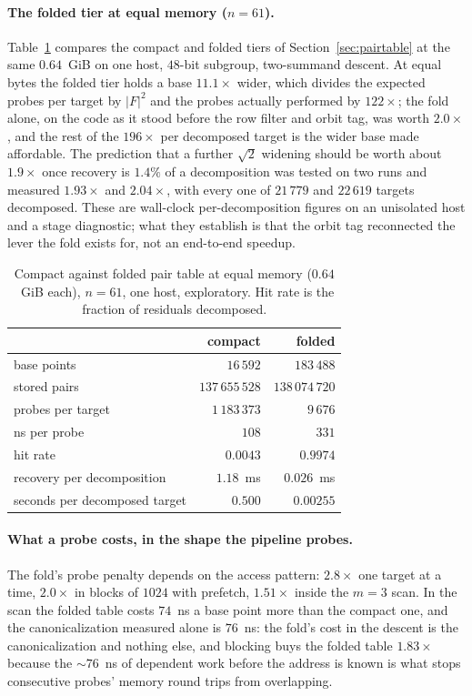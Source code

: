 \paragraph{The folded tier at equal memory ($n=61$).}
Table~\ref{tab:fold-equal} compares the compact and folded tiers of
Section~\ref{sec:pairtable} at the same $0.64$~GiB on one host, $48$-bit
subgroup, two-summand descent.
At equal bytes the folded tier holds a base $11.1\times$ wider, which
divides the expected probes per target by $|F|^2$ and the probes
actually performed by $122\times$; the fold alone, on the code as it
stood before the row filter and orbit tag, was worth $2.0\times$, and
the rest of the $196\times$ per decomposed target is the wider base
made affordable. The prediction that a further $\sqrt2$ widening
should be worth about $1.9\times$ once recovery is $1.4\%$ of a
decomposition was tested on two runs and measured $1.93\times$ and
$2.04\times$, with every one of $21\,779$ and $22\,619$ targets
decomposed. These are wall-clock per-decomposition figures on an
unisolated host and a stage diagnostic; what they establish is that
the orbit tag reconnected the lever the fold exists for, not an
end-to-end speedup.

\begin{table}[t]
\centering\small
\caption{Compact against folded pair table at equal memory ($0.64$~GiB each), $n=61$, one host, exploratory. Hit rate is the fraction of residuals decomposed.}
\label{tab:fold-equal}
\begin{tabular}{@{}lrr@{}}
\toprule
 & compact & folded \\
\midrule
base points & $16\,592$ & $183\,488$ \\
stored pairs & $137\,655\,528$ & $138\,074\,720$ \\
probes per target & $1\,183\,373$ & $9\,676$ \\
ns per probe & $108$ & $331$ \\
hit rate & $0.0043$ & $0.9974$ \\
recovery per decomposition & $1.18$~ms & $0.026$~ms \\
seconds per decomposed target & $0.500$ & $0.00255$ \\
\bottomrule
\end{tabular}
\end{table}

\paragraph{What a probe costs, in the shape the pipeline probes.}
The fold's probe penalty depends on the access pattern: $2.8\times$
one target at a time, $2.0\times$ in blocks of $1024$ with prefetch,
$1.51\times$ inside the $m=3$ scan. In the scan the folded table costs
$74$~ns a base point more than the compact one, and the
canonicalization measured alone is $76$~ns: the fold's cost in the
descent is the canonicalization and nothing else, and blocking buys
the folded table $1.83\times$ because the $\sim76$~ns of dependent work
before the address is known is what stops consecutive probes'
memory round trips from
overlapping.

